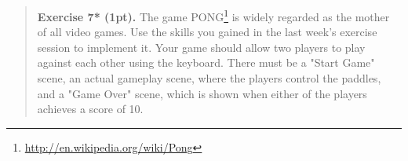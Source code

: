 \documentclass{article}
\newenvironment{exercise}[2]{\begin{verse}\textbf{Exercise #1 (#2pt).} }{
\end{verse}\medskip}
\begin{document}
\begin{exercise}{7*}{1}
The game PONG\footnote{\url{http://en.wikipedia.org/wiki/Pong}} is widely regarded as the mother of all video games. Use the skills you gained in the last week's exercise session to implement it. Your game should allow two players to play against each other using the keyboard. There must be a "Start Game" scene, an actual gameplay scene, where the players control the paddles, and a "Game Over" scene, which is shown when either of the players achieves a score of 10.
\end{exercise}
\end{document}
